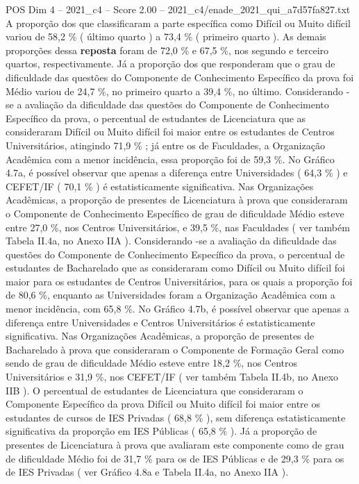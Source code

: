 \begin{textsample}{POS Dim 4 – 2021\_c4 – Score 2.00 – 2021\_c4/enade\_2021\_qui\_a7d57fa827.txt}
A proporção dos que classificaram a parte específica como Difícil ou Muito difícil variou de 58,2 \% ( último quarto ) a 73,4 \% ( primeiro quarto ).
As demais proporções dessa \textbf{reposta} foram de 72,0 \% e 67,5 \%, nos segundo e terceiro quartos, respectivamente.
Já a proporção dos que responderam que o grau de dificuldade das questões do Componente de Conhecimento Específico da prova foi Médio variou de 24,7 \%, no primeiro quarto a 39,4 \%, no último.
Considerando -se a avaliação da dificuldade das questões do Componente de Conhecimento Específico da prova, o percentual de estudantes de Licenciatura que as consideraram Difícil ou Muito difícil foi maior entre os estudantes de Centros Universitários, atingindo 71,9 \% ; já entre os de Faculdades, a Organização Acadêmica com a menor incidência, essa proporção foi de 59,3 \%.
No Gráfico 4.7a, é possível observar que apenas a diferença entre Universidades ( 64,3 \% ) e CEFET/IF ( 70,1 \% ) é estatisticamente significativa.
Nas Organizações Acadêmicas, a proporção de presentes de Licenciatura à prova que consideraram o Componente de Conhecimento Específico de grau de dificuldade Médio esteve entre 27,0 \%, nos Centros Universitários, e 39,5 \%, nas Faculdades ( ver também Tabela II.4a, no Anexo IIA ).
Considerando -se a avaliação da dificuldade das questões do Componente de Conhecimento Específico da prova, o percentual de estudantes de Bacharelado que as consideraram como Difícil ou Muito difícil foi maior para os estudantes de Centros Universitários, para os quais a proporção foi de 80,6 \%, enquanto as Universidades foram a Organização Acadêmica com a menor incidência, com 65,8 \%.
No Gráfico 4.7b, é possível observar que apenas a diferença entre Universidades e Centros Universitários é estatisticamente significativa.
Nas Organizações Acadêmicas, a proporção de presentes de Bacharelado à prova que consideraram o Componente de Formação Geral como sendo de grau de dificuldade Médio esteve entre 18,2 \%, nos Centros Universitários e 31,9 \%, nos CEFET/IF ( ver também Tabela II.4b, no Anexo IIB ).
O percentual de estudantes de Licenciatura que consideraram o Componente Específico da prova Difícil ou Muito difícil foi maior entre os estudantes de cursos de IES Privadas ( 68,8 \% ), sem diferença estatisticamente significativa da proporção em IES Públicas ( 65,8 \% ).
Já a proporção de presentes de Licenciatura à prova que avaliaram este componente como de grau de dificuldade Médio foi de 31,7 \% para os de IES Públicas e de 29,3 \% para os de IES Privadas ( ver Gráfico 4.8a e Tabela II.4a, no Anexo IIA ).

\end{textsample}
